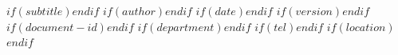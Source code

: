 
\renewcommand{\metaTitle}{$title$}
$if(subtitle)$\renewcommand{\metaSubtitle}{$subtitle$}$endif$
$if(author)$\renewcommand{\metaAuthor}{$for(author)$$author$$sep$, $endfor$}$endif$
$if(date)$\renewcommand{\metaDate}{$date$}$endif$
$if(version)$\renewcommand{\metaVersion}{$version$}$endif$
$if(document-id)$\renewcommand{\metaDocId}{$document-id$}$endif$
$if(department)$\renewcommand{\metaDepartment}{$department$}$endif$
$if(tel)$\renewcommand{\metaTel}{$tel$}$endif$
$if(location)$\renewcommand{\metaLocation}{$location$}$endif$

\thispagestyle{firstpage}
\titleblock
\clearpage
\setcounter{page}{1}